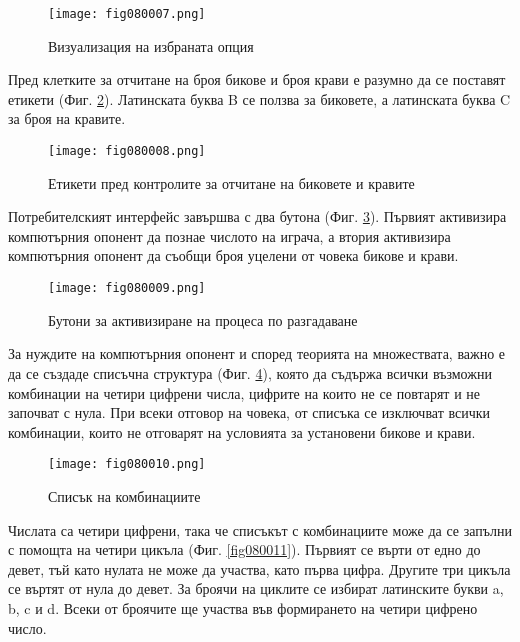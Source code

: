 \begin{figure}[H]
  \centering
  \texttt{[image: fig080007.png]}
  \caption{Визуализация на избраната опция}
\label{fig080007}
\end{figure}

Пред клетките за отчитане на броя бикове и броя крави е разумно да се поставят етикети (Фиг. \ref{fig080008}). Латинската буква B се ползва за биковете, а латинската буква C за броя на кравите. 

\begin{figure}[H]
  \centering
  \texttt{[image: fig080008.png]}
  \caption{Етикети пред контролите за отчитане на биковете и кравите}
\label{fig080008}
\end{figure}

Потребителският интерфейс завършва с два бутона (Фиг. \ref{fig080009}). Първият активизира компютърния опонент да познае числото на играча, а втория активизира компютърния опонент да съобщи броя уцелени от човека бикове и крави.

\begin{figure}[H]
  \centering
  \texttt{[image: fig080009.png]}
  \caption{Бутони за активизиране на процеса по разгадаване}
\label{fig080009}
\end{figure}

За нуждите на компютърния опонент и според теорията на множествата, важно е да се създаде списъчна структура (Фиг. \ref{fig080010}), която да съдържа всички възможни комбинации на четири цифрени числа, цифрите на които не се повтарят и не започват с нула. При всеки отговор на човека, от списъка се изключват всички комбинации, които не отговарят на условията за установени бикове и крави.

\begin{figure}[H]
  \centering
  \texttt{[image: fig080010.png]}
  \caption{Списък на комбинациите}
\label{fig080010}
\end{figure}

Числата са четири цифрени, така че списъкът с комбинациите може да се запълни с помощта на четири цикъла (Фиг. \ref{fig080011}). Първият се върти от едно до девет, тъй като нулата не може да участва, като първа цифра. Другите три цикъла се въртят от нула до девет. За броячи на циклите се избират латинските букви a, b, c и d. Всеки от броячите ще участва във формирането на четири цифрено число.

